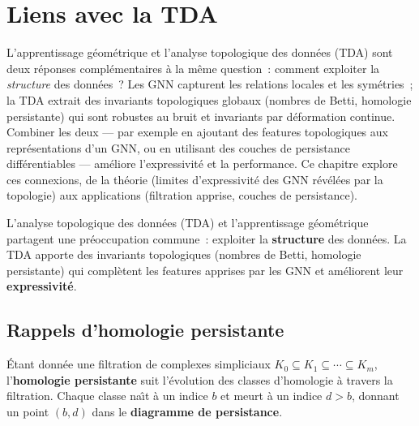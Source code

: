 \chapter{Liens avec la TDA}
\label{ch:tda}

L'apprentissage g\'eom\'etrique et l'analyse topologique des donn\'ees (TDA) sont deux r\'eponses compl\'ementaires \`a la m\^eme question~: comment exploiter la \emph{structure} des donn\'ees~? Les GNN capturent les relations locales et les sym\'etries~; la TDA extrait des invariants topologiques globaux (nombres de Betti, homologie persistante) qui sont robustes au bruit et invariants par d\'eformation continue. Combiner les deux --- par exemple en ajoutant des features topologiques aux repr\'esentations d'un GNN, ou en utilisant des couches de persistance diff\'erentiables --- am\'eliore l'expressivit\'e et la performance. Ce chapitre explore ces connexions, de la th\'eorie (limites d'expressivit\'e des GNN r\'ev\'el\'ees par la topologie) aux applications (filtration apprise, couches de persistance).

\begin{intuition}
L'analyse topologique des donn\'ees (TDA) et
l'apprentissage g\'eom\'etrique partagent une pr\'eoccupation
commune~: exploiter la \textbf{structure} des donn\'ees. La TDA
apporte des invariants topologiques (nombres de Betti, homologie
persistante) qui compl\`etent les features apprises par les GNN
et am\'eliorent leur \textbf{expressivit\'e}.
\end{intuition}

\section{Rappels d'homologie persistante}
\label{sec:rappels_persistance}

\begin{definition}
\'Etant donn\'ee une filtration de complexes simpliciaux
$K_0 \subseteq K_1 \subseteq \cdots \subseteq K_m$, l'\textbf{homologie
persistante} suit l'\'evolution des classes d'homologie \`a travers
la filtration. Chaque classe na\^\i t \`a un indice $b$ et meurt
\`a un indice $d > b$, donnant un point $(b, d)$ dans le
\textbf{diagramme de persistance}.
\end{definition}

